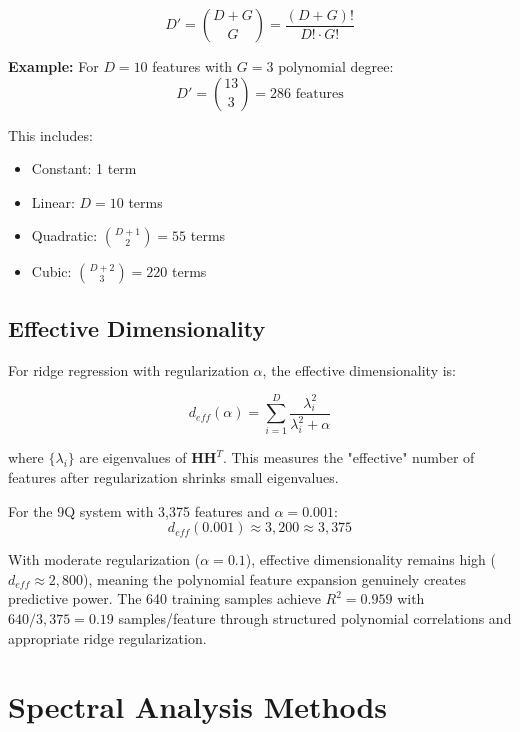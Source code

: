 \documentclass[conference]{IEEEtran}
\begin{document}
\begin{equation}
D' = \binom{D + G}{G} = \frac{(D+G)!}{D! \cdot G!}
\label{eq:poly_dimension}
\end{equation}

\textbf{Example:} For $D=10$ features with $G=3$ polynomial degree:
\begin{equation}
D' = \binom{13}{3} = 286 \text{ features}
\end{equation}

This includes:
\begin{itemize}
    \item Constant: 1 term
    \item Linear: $D = 10$ terms
    \item Quadratic: $\binom{D+1}{2} = 55$ terms
    \item Cubic: $\binom{D+2}{3} = 220$ terms
\end{itemize}

\subsection{Effective Dimensionality}

For ridge regression with regularization $\alpha$, the effective dimensionality is:

\begin{equation}
d_{eff}(\alpha) = \sum_{i=1}^{D} \frac{\lambda_i^2}{\lambda_i^2 + \alpha}
\label{eq:effective_dimension}
\end{equation}

where $\{\lambda_i\}$ are eigenvalues of $\mathbf{H}\mathbf{H}^T$. This measures the "effective" number of features after regularization shrinks small eigenvalues.

For the 9Q system with 3,375 features and $\alpha=0.001$:
\begin{equation}
d_{eff}(0.001) \approx 3,200 \approx 3,375
\end{equation}

With moderate regularization ($\alpha=0.1$), effective dimensionality remains high ($d_{eff} \approx 2,800$), meaning the polynomial feature expansion genuinely creates predictive power. The 640 training samples achieve $R^2=0.959$ with $640/3,375 = 0.19$ samples/feature through structured polynomial correlations and appropriate ridge regularization.

\section{Spectral Analysis Methods}
\label{app:spectral_methods}
\end{document}
